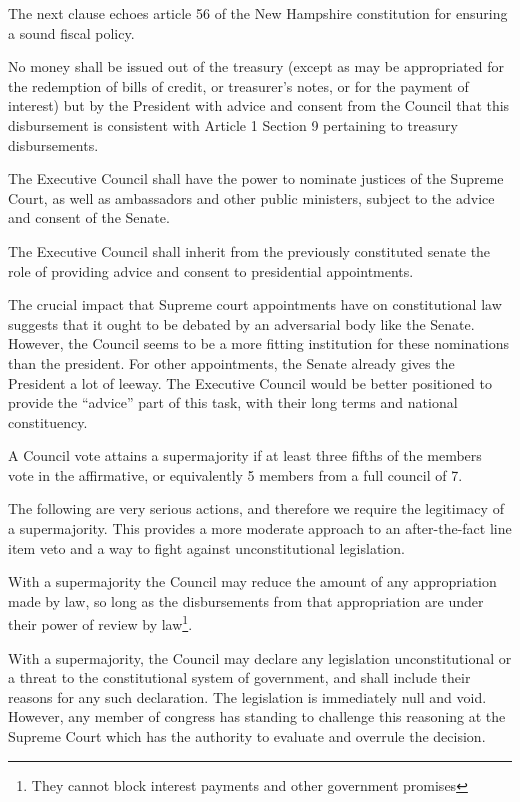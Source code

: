 \documentclass{article}
\newcommand{\quotes}[1]{``#1''}
\begin{document}
The next clause echoes article 56 of the New Hampshire constitution\cite{New Hampshire Constitution} for ensuring a sound fiscal policy.

\begin{quoting}
No money shall be issued out of the treasury (except as may be appropriated for the redemption of bills of credit, or treasurer's notes, or for the payment of interest) but by the President with advice and consent from the Council that this disbursement is consistent with Article 1 Section 9 pertaining to treasury disbursements.

The Executive Council shall have the power to nominate justices of the Supreme Court, as well as ambassadors and other public ministers, subject to the advice and consent of the Senate.

The Executive Council shall inherit from the previously constituted senate the role of providing advice and consent to presidential appointments.
\end{quoting}

The crucial impact that Supreme court appointments have on constitutional law suggests that it ought to be debated by an adversarial body like the Senate. However, the Council seems to be a more fitting institution for these nominations than the president. For other appointments, the Senate already gives the President a lot of leeway. The Executive Council would be better positioned to provide the \quotes{advice} part of this task, with their long terms and national constituency.

\begin{quoting}
A Council vote attains a supermajority if at least three fifths of the members vote in the affirmative, or equivalently 5 members from a full council of 7.
\end{quoting}

The following are very serious actions, and therefore we require the legitimacy of a supermajority. This provides a more moderate approach to an after-the-fact line item veto and a way to fight against unconstitutional legislation.

\begin{quoting}
With a supermajority the Council may reduce the amount of any appropriation made by law, so long as the disbursements from that appropriation are under their power of review by law\footnote{They cannot block interest payments and other government promises}.

With a supermajority, the Council may declare any legislation unconstitutional or a threat to the constitutional system of government, and shall include their reasons for any such declaration. The legislation is immediately null and void. However, any member of congress has standing to challenge this reasoning at the Supreme Court which has the authority to evaluate and overrule the decision.
\end{quoting}
\end{document}
